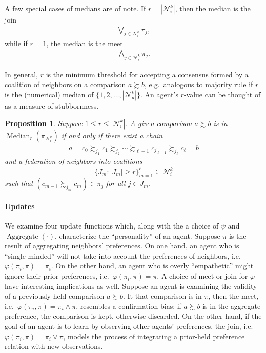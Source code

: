 \documentclass[conference]{ieeeconf}
\newcommand{\N}{\mathcal{N}}
\newcommand{\prefers}{\succsim}
\newcommand{\join}{\vee}
\newcommand{\meet}{\wedge}
\newcommand{\bigjoin}{\bigvee}
\newcommand{\bigmeet}{\bigwedge}
\renewcommand{\leq}{\leqslant}
\renewcommand{\geq}{\geqslant}
\DeclareMathOperator{\Aggregate}{Aggregate}
\DeclareMathOperator{\Median}{Median}
\newtheorem{proposition}{Proposition}
\begin{document}
A few special cases of medians are of note. If $r= |\N_i^k|$, then the median is the join
\begin{align*}
   \bigjoin_{j \in \N_i^k} \pi_j,
\end{align*}
while if $r=1$, the median is the meet
\begin{align*}
     \bigmeet_{j \in \N_i^k} \pi_j.
\end{align*}

In general, $r$ is the minimum threshold for accepting a consensus formed by a coalition of neighbors on a comparison $a \prefers b$, e.g.~analogous to majority rule if $r$ is the (numerical) median of $\{1,2,\dots, |\N_u^k|\}$. An agent's $r$-value can be thought of as a measure of stubbornness.

\begin{proposition}
    Suppose $1 \leq r \leq |\N_i^k|$. A given comparison $a \prefers b$ is in $\Median_r(\pi_{\N_i^k})$ if and only if there exist a chain
    \begin{align*}
        a = c_0 \prefers_{j_1} c_1 \prefers_{j_2} \cdots \prefers_{\ell-1} c_{j_{\ell-1}} \prefers_{j_\ell} c_{\ell} = b
    \end{align*}
    and a federation of neighbors into coalitions \[\{ J_m : |J_m| \geq r \}_{m=1}^{\ell} \subseteq \N_i^k\] such that $(c_{m-1} \prefers_{j_m} c_{m}) \in \pi_j$ for all  $j \in J_m$.
\end{proposition}

\paragraph*{Updates}
We examine four update functions which, along with the a choice of $\psi$ and $\Aggregate(\cdot)$, characterize the ``personality'' of an agent. Suppose $\pi$ is the result of aggregating neighbors' preferences. On one hand, an agent who is ``single-minded'' will not take into account the preferences of neighbors, i.e.~$\varphi(\pi_i,\pi) = \pi_i$. On the other hand, an agent who is overly ``empathetic'' might ignore their prior preferences, i.e.~$\varphi(\pi_i,\pi) = \pi$. A choice of meet or join for $\varphi$ have interesting implications as well. Suppose an agent is examining the validity of a previously-held comparison $a \prefers b$. It that comparison is in $\pi$, then the meet, i.e.~$\varphi(\pi_i,\pi) = \pi_i \meet \pi$, resembles a confirmation bias: if $a \prefers b$ is in the aggregate preference, the comparison is kept, otherwise discarded. On the other hand, if the goal of an agent is to learn by observing other agents' preferences, the join, i.e.~$\varphi(\pi_i,\pi) = \pi_i \join \pi$, models the process of integrating a prior-held preference relation with new observations.
\end{document}
